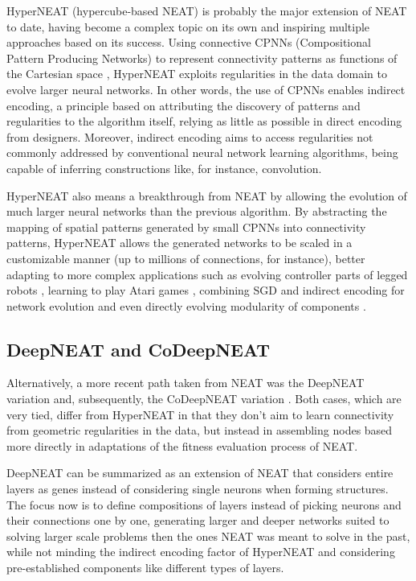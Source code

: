 \documentclass[12pt]{article}
\begin{document}
HyperNEAT (hypercube-based NEAT) is probably the major extension of NEAT to date, having become a complex topic on its own and inspiring multiple approaches based on its success. Using connective CPNNs (Compositional Pattern Producing Networks) to represent connectivity patterns as functions of the Cartesian space \cite{hyperneat}, HyperNEAT exploits regularities in the data domain to evolve larger neural networks. In other words, the use of CPNNs enables indirect encoding, a principle based on attributing the discovery of patterns and regularities to the algorithm itself, relying as little as possible in direct encoding from designers. Moreover, indirect encoding aims to access regularities not commonly addressed by conventional neural network learning algorithms, being capable of inferring constructions like, for instance, convolution.

HyperNEAT also means a breakthrough from NEAT by allowing the evolution of much larger neural networks than the previous algorithm. By abstracting the mapping of spatial patterns generated by small CPNNs into connectivity patterns, HyperNEAT allows the generated networks to be scaled in a customizable manner (up to millions of connections, for instance), better adapting to more complex applications such as evolving controller parts of legged robots \cite{4983289}, learning to play Atari games \cite{hausknecht:tciaig13}, combining SGD and indirect encoding for network evolution \cite{Fernando:2016:CED:2908812.2908890} and even directly evolving modularity of components \cite{Verbancsics:2011:CCE:2001576.2001776}.

\subsection{DeepNEAT and CoDeepNEAT}
Alternatively, a more recent path taken from NEAT was the DeepNEAT variation and, subsequently, the CoDeepNEAT variation \cite{DBLP:journals/corr/MiikkulainenLMR17}. Both cases, which are very tied, differ from HyperNEAT in that they don't aim to learn connectivity from geometric regularities in the data, but instead in assembling nodes based more directly in adaptations of the fitness evaluation process of NEAT.

DeepNEAT can be summarized as an extension of NEAT that considers entire layers as genes instead of considering single neurons when forming structures. The focus now is to define compositions of layers instead of picking neurons and their connections one by one, generating larger and deeper networks suited to solving larger scale problems then the ones NEAT was meant to solve in the past, while not minding the indirect encoding factor of HyperNEAT and considering pre-established components like different types of layers.
\end{document}
